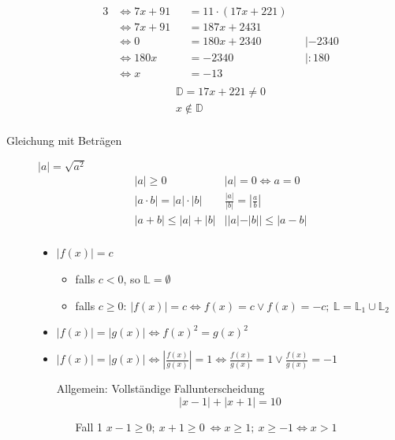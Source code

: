 \begin{description}
\begin{alignat*}{3}
        & \Leftrightarrow 7x + 91     &  & = 11 \cdot (17x+221)                          \\
        & \Leftrightarrow 7x + 91     &  & = 187x + 2431                                 \\
        & \Leftrightarrow 0           &  & = 180x +2340         &  & |-2340              \\
        & \Leftrightarrow 180x        &  & = -2340              &  & | :180              \\
        & \Leftrightarrow x           &  & = -13                                         \\
    \end{alignat*}
    \begin{gather*}
        \mathbb{D} = 17x+221 \not = 0\\
        x \not \in \mathbb{D}\\
    \end{gather*}
    \item[Gleichung mit Beträgen] $|a| = \sqrt{a^2}$
    \[\begin{array}{ll}
          |a| \geq 0                  & |a| = 0 \Leftrightarrow a = 0              \\
          |a \cdot b| = |a| \cdot |b| & \frac{|a|}{|b|} = \left|\frac{a}{b}\right| \\
          |a+b| \leq  |a| + |b|         & ||a|-|b|| \leq |a-b|                       \\
    \end{array}\]
    \begin{itemize}
        \item $|f(x)| = c$ \
        \begin{itemize}
            \item falls $c<0$, so $\mathbb{L}= \emptyset$
            \item falls $c\geq0$: $|f(x)| = c \Leftrightarrow f(x) = c \vee f(x) = -c;\ \mathbb{L} = \mathbb{L}_1 \cup \mathbb{L}_2$
        \end{itemize}
        \item $|f(x)| = |g(x)| \Leftrightarrow f(x)^2 = g(x)^2$
        \item $|f(x)| = |g(x)| \Leftrightarrow \left|\frac{f(x)}{g(x)}\right| = 1 \Leftrightarrow \frac{f(x)}{g(x)} = 1 \vee \frac{f(x)}{g(x)} = -1$
        \item[Allgemein:] Vollständige Fallunterscheidung
        \[|x-1|+|x+1|=10\]
        \begin{itemize}
            \item[Fall 1] $x-1 \geq 0;\ x+1 \geq 0 \ \Leftrightarrow x \geq 1;\ x\geq -1 \Leftrightarrow x>1$

\end{itemize}
\end{itemize}
\end{description}
